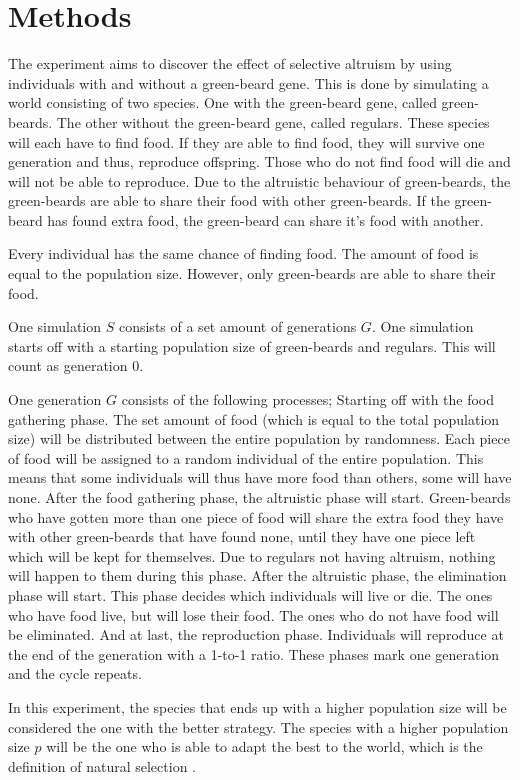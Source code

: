 \documentclass[conference]{IEEEtran}
\begin{document}
	\section{Methods}
	The experiment aims to discover the effect of selective altruism by using individuals with and without a green-beard gene. This is done by simulating a world consisting of two species. One with the green-beard gene, called green-beards. The other without the green-beard gene, called regulars. These species will each have to find food. If they are able to find food, they will survive one generation and thus, reproduce offspring. Those who do not find food will die and will not be able to reproduce. Due to the altruistic behaviour of green-beards, the green-beards are able to share their food with other green-beards. If the green-beard has found extra food, the green-beard can share it's food with another. 
	
	Every individual has the same chance of finding food. The amount of food is equal to the population size. However, only green-beards are able to share their food.
	
	One simulation $S$ consists of a set amount of generations $G$. One simulation starts off with a starting population size of green-beards and regulars. This will count as generation 0. 
	
	One generation $G$ consists of the following processes; Starting off with the food gathering phase. The set amount of food (which is equal to the total population size) will be distributed between the entire population by randomness. Each piece of food will be assigned to a random individual of the entire population. This means that some individuals will thus have more food than others, some will have none. After the food gathering phase, the altruistic phase will start. Green-beards who have gotten more than one piece of food will share the extra food they have with other green-beards that have found none, until they have one piece left which will be kept for themselves. Due to regulars not having altruism, nothing will happen to them during this phase. After the altruistic phase, the elimination phase will start. This phase decides which individuals will live or die. The ones who have food live, but will lose their food. The ones who do not have food will be eliminated. And at last, the reproduction phase. Individuals will reproduce at the end of the generation with a 1-to-1 ratio. These phases mark one generation and the cycle repeats.
	
	In this experiment, the species that ends up with a higher population size  will be considered the one with the better strategy. The species with a higher population size $p$ will be the one who is able to adapt the best to the world, which is the definition of natural selection \cite{fisher1958genetical}.
	
\end{document}
